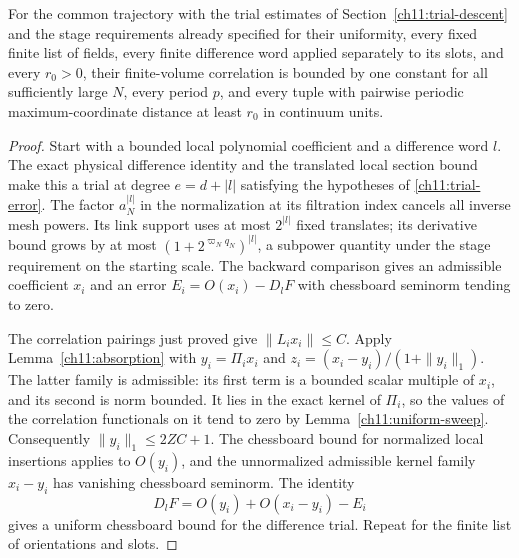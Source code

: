 \begin{theorem}
\label{ch11:all-period-differences}
For the common trajectory with the trial estimates of
Section~\ref{ch11:trial-descent} and the stage requirements already
specified for their uniformity, every fixed finite list of
fields, every finite difference word applied separately to its
slots, and every $r_0>0$, their finite-volume correlation is bounded
by one constant for all sufficiently large $N$, every period $p$,
and every tuple with pairwise periodic maximum-coordinate distance
at least $r_0$ in continuum units.
\end{theorem}
\begin{proof}
Start with a bounded local polynomial coefficient and a difference word $l$.
The exact physical difference identity and the translated local
section bound make this a trial at degree $e=d+|l|$ satisfying the hypotheses of \eqref{ch11:trial-error}.
The factor $a_N^{|l|}$ in the normalization at its filtration index cancels all inverse mesh
powers. Its link support uses at most $2^{|l|}$ fixed translates;
its derivative bound grows by at most
$(1+2^{\varpi_Nq_N})^{|l|}$, a subpower quantity under the stage
requirement on the starting scale. The backward comparison gives an admissible coefficient
$x_i$ and an error $E_i=O(x_i)-D_lF$ with chessboard seminorm tending to zero.

The correlation pairings just proved give $\|L_ix_i\|\le C$.
Apply Lemma~\ref{ch11:absorption} with
$y_i=\Pi_i x_i$ and
$z_i=(x_i-y_i)/(1+\|y_i\|_1)$.
The latter family is admissible: its first term is a bounded
scalar multiple of $x_i$, and its second is norm bounded.
It lies in the exact kernel of $\Pi_i$, so the values of the correlation functionals on it tend to
zero by Lemma~\ref{ch11:uniform-sweep}.
Consequently $\|y_i\|_1\le2ZC+1$.
The chessboard bound for normalized local insertions applies to $O(y_i)$,
and the unnormalized admissible kernel family $x_i-y_i$
has vanishing chessboard seminorm. The identity
\[
 D_lF=O(y_i)+O(x_i-y_i)-E_i
\]
gives a uniform chessboard bound for the difference trial.
Repeat for the finite list of orientations and slots.


\end{proof}
